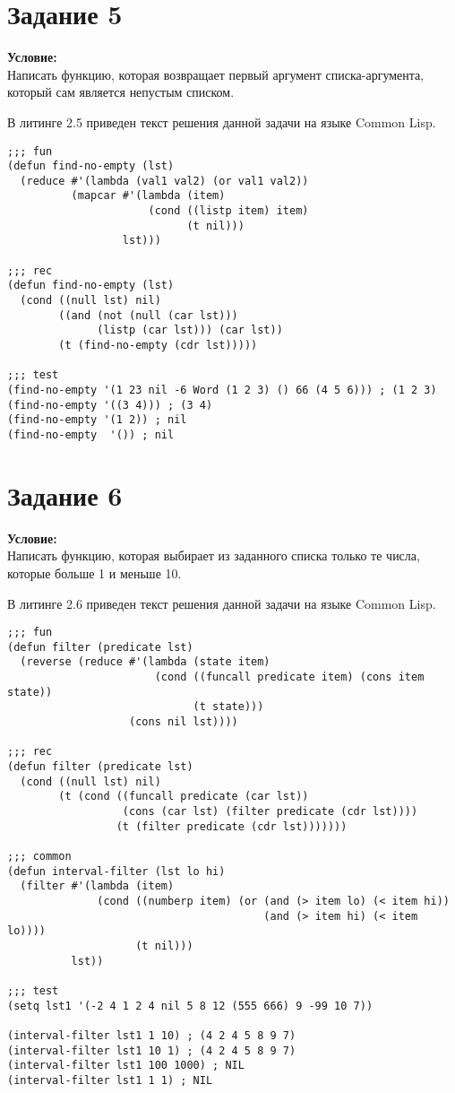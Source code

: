 \section{Задание \No{}5}
\textbf{Условие:}\\Написать функцию, которая возвращает первый аргумент списка-аргумента, который сам является непустым списком.

В литинге 2.5 приведен текст решения данной задачи на языке Common Lisp.

\begin{lstlisting}[caption={Задание \No{}5}]
;;; fun
(defun find-no-empty (lst)
  (reduce #'(lambda (val1 val2) (or val1 val2))
          (mapcar #'(lambda (item)
                      (cond ((listp item) item)
                            (t nil)))
                  lst)))

;;; rec
(defun find-no-empty (lst)
  (cond ((null lst) nil)
        ((and (not (null (car lst)))
              (listp (car lst))) (car lst))
        (t (find-no-empty (cdr lst)))))

;;; test
(find-no-empty '(1 23 nil -6 Word (1 2 3) () 66 (4 5 6))) ; (1 2 3)
(find-no-empty '((3 4))) ; (3 4)
(find-no-empty '(1 2)) ; nil
(find-no-empty  '()) ; nil
\end{lstlisting}

\section{Задание \No{}6}
\textbf{Условие:}\\Написать функцию, которая выбирает из заданного списка только те числа, которые больше 1 и меньше 10.

В литинге 2.6 приведен текст решения данной задачи на языке Common Lisp.

\begin{lstlisting}[caption={Задание \No{}6}]
;;; fun
(defun filter (predicate lst)
  (reverse (reduce #'(lambda (state item)
                       (cond ((funcall predicate item) (cons item state))
                             (t state)))
                   (cons nil lst))))

;;; rec
(defun filter (predicate lst)
  (cond ((null lst) nil)
        (t (cond ((funcall predicate (car lst))
                  (cons (car lst) (filter predicate (cdr lst))))
                 (t (filter predicate (cdr lst)))))))

;;; common
(defun interval-filter (lst lo hi)
  (filter #'(lambda (item)
              (cond ((numberp item) (or (and (> item lo) (< item hi))
                                        (and (> item hi) (< item lo))))
                    (t nil)))
          lst))

;;; test
(setq lst1 '(-2 4 1 2 4 nil 5 8 12 (555 666) 9 -99 10 7))

(interval-filter lst1 1 10) ; (4 2 4 5 8 9 7)
(interval-filter lst1 10 1) ; (4 2 4 5 8 9 7)
(interval-filter lst1 100 1000) ; NIL
(interval-filter lst1 1 1) ; NIL
\end{lstlisting}

